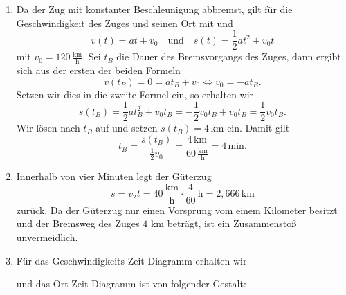 \begin{MExercises}
\begin{MExercise}
     \begin{MSolution}
     \begin{enumerate}
     \item  Da der Zug mit konstanter Beschleunigung abbremst, gilt f\"ur die Geschwindigkeit des Zuges und seinen Ort mit  und 
     \begin{equation*}
     v(t)=a t+v_0 \quad\text{und}\quad 
     s(t)=\frac{1}{2}a t^2+v_0 t
     \end{equation*} mit $v_0=120\,\frac{\text{km}}{\text{h}}$. Sei $t_B$ die Dauer des Bremsvorgangs des Zuges, dann ergibt sich aus der ersten der beiden Formeln 
     \begin{equation*}
     v(t_B)=0=a t_B+v_0\Leftrightarrow v_0=-at_B. 
     \end{equation*} Setzen wir dies in die zweite Formel ein, so erhalten wir
     \begin{equation*}
     s(t_B)=\frac{1}{2}at_B^2+v_0 t_B=-\frac{1}{2}v_0t_B+v_0t_B=\frac{1}{2}v_0t_B.
     \end{equation*}
     Wir l\"osen nach $t_B$ auf und setzen $s(t_B)=4\,\text{km}$ ein. Damit gilt
      \begin{equation*}
     t_B=\frac{s(t_B)}{\frac{1}{2}v_0}=\frac{4\,\text{km}}{60\,\frac{\text{km}}{\text{h}}}=4 \,\text{min}.
      \end{equation*}
      \item Innerhalb von vier Minuten legt der G\"uterzug 
      \begin{equation*}
      s=v_2t=40 \,\frac{\text{km}}{\text{h}}\cdot \frac{4}{60}\,\text{h}= {2,666} \,\text{km}
      \end{equation*} zur\"uck. Da der G\"uterzug nur einen Vorsprung vom einem Kilometer besitzt und der Bremsweg des Zuges $4$ km betr\"agt, ist ein Zusammensto{\ss} unvermeidlich.
      \item F\"ur das Geschwindigkeits-Zeit-Diagramm erhalten wir
      
      
      
      und das Ort-Zeit-Diagramm ist von folgender Gestalt:
      
      
      

\end{enumerate}
\end{MSolution}
\end{MExercise}
\end{MExercises}
